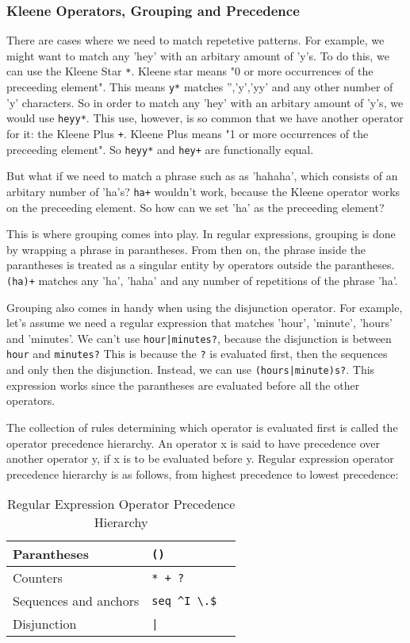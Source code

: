 \subsubsection{Kleene Operators, Grouping and Precedence}

There are cases where we need to match repetetive patterns.
For example, we might want to match any 'hey' with an arbitary amount of 'y's.
To do this, we can use the Kleene Star \texttt{*}.
Kleene star means "0 or more occurrences of the preceeding element".
This means \texttt{y*} matches '','y','yy' and any other number of 'y' characters.
So in order to match any 'hey' with an arbitary amount of 'y's, we would use \texttt{heyy*}.
This use, however, is so common that we have another operator for it: the Kleene Plus \texttt{+}.
Kleene Plus means "1 or more occurrences of the preceeding element".
So \texttt{heyy*} and \texttt{hey+} are functionally equal.

But what if we need to match a phrase such as as 'hahaha', which consists of an arbitary number of 'ha's?
\texttt{ha+} wouldn't work, because the Kleene operator works on the preceeding element.
So how can we set 'ha' as the preceeding element?

This is where grouping comes into play.
In regular expressions, grouping is done by wrapping a phrase in parantheses. 
From then on, the phrase inside the parantheses is treated as a singular entity by operators outside the parantheses.
\texttt{(ha)+} matches any 'ha', 'haha' and any number of repetitions of the phrase 'ha'.

Grouping also comes in handy when using the disjunction operator.
For example, let's assume we need a regular expression that matches 'hour', 'minute', 'hours' and 'minutes'.
We can't use \texttt{hour|minutes?}, because the disjunction is between \texttt{hour} and \texttt{minutes?}
This is because the \texttt{?} is evaluated first, then the sequences and only then the disjunction. 
Instead, we can use \texttt{(hours|minute)s?}. 
This expression works since the parantheses are evaluated before all the other operators.

The collection of rules determining which operator is evaluated first is called the operator precedence hierarchy.
An operator x is said to have precedence over another operator y, if x is to be evaluated before y.
Regular expression operator precedence hierarchy is as follows, from highest precedence to lowest precedence:

\begin{table}[htbp]
  \caption[Regular Expression Operator Precedence Hierarchy]{Regular Expression Operator Precedence Hierarchy}\label{tab:re_oph}
  \centering
  \begin{tabular}{l l l}
    Parantheses&\texttt{()}&\\ \hline 
    Counters&\texttt{* + ?}&\\ \hline 
    Sequences and anchors&\texttt{seq \^{}I \textbackslash.\$}&\\ \hline 
    Disjunction&\texttt{|}&\\ \hline 
  \end{tabular}
\end{table}


